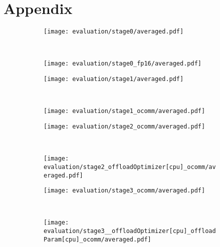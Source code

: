 \section*{Appendix}

\begin{figure}[H]

    \centering

    \begin{subfigure}[t]{0.49\textwidth}
        \centering
        \texttt{[image: evaluation/stage0/averaged.pdf]}
    \end{subfigure}%
    ~
    \begin{subfigure}[t]{0.49\textwidth}
        \centering
        \texttt{[image: evaluation/stage0\_fp16/averaged.pdf]}
    \end{subfigure}

    \begin{subfigure}[t]{0.49\textwidth}
        \centering
        \texttt{[image: evaluation/stage1/averaged.pdf]}
    \end{subfigure}%
    ~
    \begin{subfigure}[t]{0.49\textwidth}
        \centering
        \texttt{[image: evaluation/stage1\_ocomm/averaged.pdf]}
    \end{subfigure}

    \begin{subfigure}[t]{0.49\textwidth}
        \centering
        \texttt{[image: evaluation/stage2\_ocomm/averaged.pdf]}
    \end{subfigure}%
    ~
    \begin{subfigure}[t]{0.49\textwidth}
        \centering
        \texttt{[image: evaluation/stage2\_offloadOptimizer[cpu]\_ocomm/averaged.pdf]}
    \end{subfigure}

    \begin{subfigure}[t]{0.49\textwidth}
        \centering
        \texttt{[image: evaluation/stage3\_ocomm/averaged.pdf]}
    \end{subfigure}%
    ~
    \begin{subfigure}[t]{0.49\textwidth}
        \centering
        \texttt{[image: evaluation/stage3\_\_offloadOptimizer[cpu]\_offloadParam[cpu]\_ocomm/averaged.pdf]}
    \end{subfigure}
    
\end{figure}